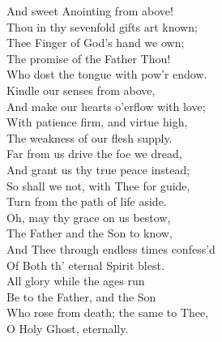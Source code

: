 {And sweet Anointing from above!\\[0.55em]
Thou in thy sevenfold gifts art known;\\
Thee Finger of God's hand we own;\\
The promise of the Father Thou!\\
Who dost the tongue with pow'r endow.\\[0.55em]
Kindle our senses from above,\\
And make our hearts o'erflow with love;\\
With patience firm, and virtue high,\\
The weakness of our flesh supply.\\[0.55em]
Far from us drive the foe we dread,\\
And grant us thy true peace instead;\\
So shall we not, with Thee for guide,\\
Turn from the path of life aside.\\[0.55em]
Oh, may thy grace on us bestow,\\
The Father and the Son to know,\\
And Thee through endless times confess'd\\
Of Both th' eternal Spirit blest.\\[0.55em]
All glory while the ages run\\
Be to the Father, and the Son\\
Who rose from death; the same to Thee,\\
O Holy Ghost, eternally.}
